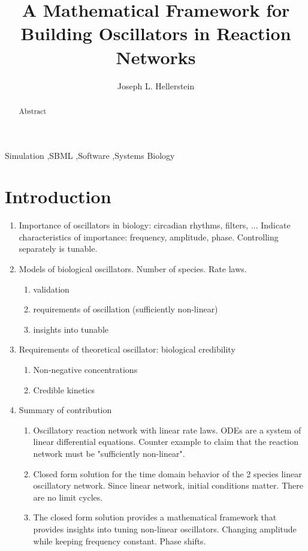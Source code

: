 \documentclass[11pt]{elsarticle}
\begin{document}
\title{A Mathematical Framework for Building Oscillators in Reaction Networks}

\author[UWBIOE]{Joseph L. Hellerstein}


\address[UWBIOE]{eScience Institute, University of Washington, Allen School of Computer Science, Seattle, WA, USA, 98195}

\begin{abstract} 
Abstract
\end{abstract}

\begin{keyword}
Simulation \sep SBML \sep Software \sep Systems Biology
\end{keyword}

\maketitle

\section*{Introduction}
\begin{enumerate}
\item Importance of oscillators in biology: circadian rhythms, filters, ... Indicate characteristics of importance: frequency, amplitude, phase. Controlling separately is tunable.
\item Models of biological oscillators. Number of species. Rate laws.
   \begin{enumerate}
       \item validation
       \item requirements of oscillation (sufficiently non-linear)
       \item insights into tunable
   \end{enumerate}
\item Requirements of theoretical oscillator: biological credibility
\begin{enumerate}
    \item Non-negative concentrations
    \item Credible kinetics
\end{enumerate}
\item Summary of contribution
\begin{enumerate}
    \item Oscillatory reaction network with linear rate laws. ODEs are a system of linear differential equations. Counter example to claim that the reaction network must be "sufficiently non-linear".
    \item Closed form solution for the time domain behavior of the 2 species linear oscillatory network. Since linear network, initial conditions matter. There are no limit cycles.
    \item The closed form solution provides a mathematical framework that provides insights into tuning non-linear oscillators. Changing amplitude while keeping frequency constant. Phase shifts.
\end{enumerate}

\end{enumerate}
\end{document}
